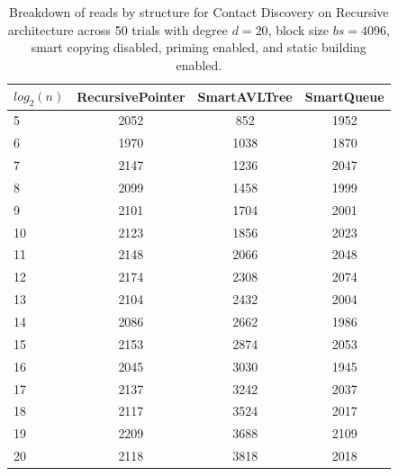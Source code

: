 \begin{table}[]
\centering
\begin{tabular}{|l|c|c|c|}
$log_2(n)$ & RecursivePointer & SmartAVLTree & SmartQueue \\ \hline
5 & 2052 & 852 & 1952 \\ \hline
6 & 1970 & 1038 & 1870 \\ \hline
7 & 2147 & 1236 & 2047 \\ \hline
8 & 2099 & 1458 & 1999 \\ \hline
9 & 2101 & 1704 & 2001 \\ \hline
10 & 2123 & 1856 & 2023 \\ \hline
11 & 2148 & 2066 & 2048 \\ \hline
12 & 2174 & 2308 & 2074 \\ \hline
13 & 2104 & 2432 & 2004 \\ \hline
14 & 2086 & 2662 & 1986 \\ \hline
15 & 2153 & 2874 & 2053 \\ \hline
16 & 2045 & 3030 & 1945 \\ \hline
17 & 2137 & 3242 & 2037 \\ \hline
18 & 2117 & 3524 & 2017 \\ \hline
19 & 2209 & 3688 & 2109 \\ \hline
20 & 2118 & 3818 & 2018 \\ \hline
\end{tabular}
\caption{Breakdown of reads by structure for Contact Discovery on Recursive architecture across 50 trials with degree $d=20$, block size $bs=4096$, smart copying disabled, priming enabled, and static building enabled.}
    \label{tab:reads_by_structure_cd_d20_bs4096_trials50_copiesfalse_primetrue_staticinsertiontrue_ptrecursive_movetrue}
\end{table}

